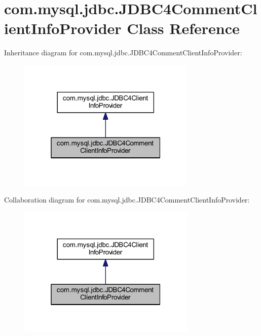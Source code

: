 \hypertarget{classcom_1_1mysql_1_1jdbc_1_1_j_d_b_c4_comment_client_info_provider}{}\section{com.\+mysql.\+jdbc.\+J\+D\+B\+C4\+Comment\+Client\+Info\+Provider Class Reference}
\label{classcom_1_1mysql_1_1jdbc_1_1_j_d_b_c4_comment_client_info_provider}


Inheritance diagram for com.\+mysql.\+jdbc.\+J\+D\+B\+C4\+Comment\+Client\+Info\+Provider\+:
\nopagebreak
\begin{figure}[H]
\begin{center}
\leavevmode
\includegraphics[width=241pt]{classcom_1_1mysql_1_1jdbc_1_1_j_d_b_c4_comment_client_info_provider__inherit__graph}
\end{center}
\end{figure}


Collaboration diagram for com.\+mysql.\+jdbc.\+J\+D\+B\+C4\+Comment\+Client\+Info\+Provider\+:
\nopagebreak
\begin{figure}[H]
\begin{center}
\leavevmode
\includegraphics[width=241pt]{classcom_1_1mysql_1_1jdbc_1_1_j_d_b_c4_comment_client_info_provider__coll__graph}
\end{center}
\end{figure}
